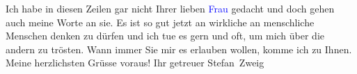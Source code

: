 \pstart
           Ich habe in diesen Zeilen gar nicht Ihrer lieben \textcolor{blue}{Frau}\ledrightnote{{$\rightarrow$}\emph{\textcolor{blue}{Olga Schnitzler}}} gedacht und doch gehen auch meine Worte an sie. Es ist
               so gut jetzt an wirkliche an menschliche Menschen denken zu dürfen und ich tue es
               gern und oft, um mich über die andern zu trösten. Wann immer Sie mir es erlauben
               wollen, komme ich zu Ihnen. Meine herzlichsten Grüsse voraus! Ihr getreuer\pend
           \pstart \spacefill\mbox{Stefan Zweig}\pend{}\endnumbering{}
\begin{anhang}
\end{anhang}
      